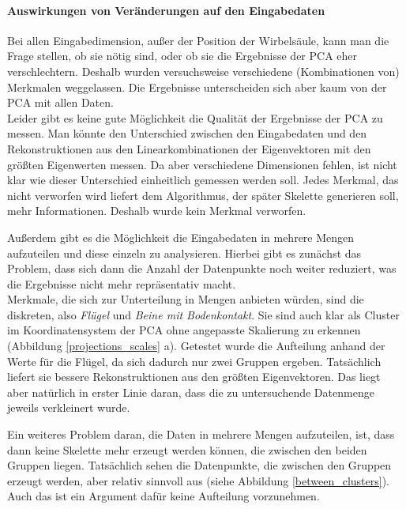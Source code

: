  \paragraph{Auswirkungen von Veränderungen auf den Eingabedaten}
 Bei allen Eingabedimension, außer der Position der Wirbelsäule, kann man die Frage stellen, ob sie nötig sind, oder ob sie die Ergebnisse der PCA eher verschlechtern. Deshalb wurden versuchsweise verschiedene (Kombinationen von) Merkmalen weggelassen. Die Ergebnisse unterscheiden sich aber kaum von der PCA mit allen Daten. \\
 Leider gibt es keine gute Möglichkeit die Qualität der Ergebnisse der PCA zu messen. Man könnte den Unterschied zwischen den Eingabedaten und den Rekonstruktionen aus den Linearkombinationen der Eigenvektoren mit den größten Eigenwerten messen. Da aber verschiedene Dimensionen fehlen, ist nicht klar wie dieser Unterschied einheitlich gemessen werden soll.
 Jedes Merkmal, das nicht verworfen wird liefert dem Algorithmus, der später Skelette generieren soll, mehr Informationen. Deshalb wurde kein Merkmal verworfen.
 
 Außerdem gibt es die Möglichkeit die Eingabedaten in mehrere Mengen aufzuteilen und diese einzeln zu analysieren. Hierbei gibt es zunächst das Problem, dass sich dann die Anzahl der Datenpunkte noch weiter reduziert, was die Ergebnisse nicht mehr repräsentativ macht.\\
 Merkmale, die sich zur Unterteilung in Mengen anbieten würden, sind die diskreten, also \emph{Flügel} und \emph{Beine mit Bodenkontakt}. Sie sind auch klar als Cluster im Koordinatensystem der PCA ohne angepasste Skalierung zu erkennen (Abbildung \ref{projections_scales} a).
 Getestet wurde die Aufteilung anhand der Werte für die Flügel, da sich dadurch nur zwei Gruppen ergeben. Tatsächlich liefert sie bessere Rekonstruktionen aus den größten Eigenvektoren. Das liegt aber natürlich in erster Linie daran, dass die zu untersuchende Datenmenge jeweils verkleinert wurde.
 
 Ein weiteres Problem daran, die Daten in mehrere Mengen aufzuteilen, ist, dass dann keine Skelette mehr erzeugt werden können, die zwischen den beiden Gruppen liegen. Tatsächlich sehen die Datenpunkte, die zwischen den Gruppen erzeugt werden, aber relativ sinnvoll aus (siehe Abbildung \ref{between_clusters}).
 Auch das ist ein Argument dafür keine Aufteilung vorzunehmen.
 
